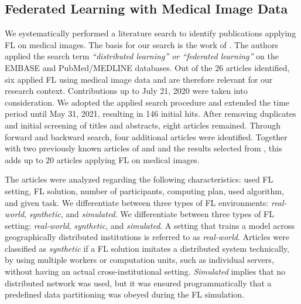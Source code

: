 \subsection{Federated Learning with Medical Image Data}
\label{subsec:LitRev}

We systematically performed a literature search to identify publications applying FL on medical images. The basis for our search is the work of \cite{Kirienko2021DistributedAI}. The authors applied the search term \textit{``distributed learning'' or ``federated learning''} on the EMBASE and PubMed/MEDLINE databases. Out of the 26 articles identified, six applied FL using medical image data and are therefore relevant for our research context. Contributions up to July 21, 2020 were taken into consideration. We adopted the applied search procedure and extended the time period until May 31, 2021, resulting in 146 initial hits. After removing duplicates and initial screening of titles and abstracts, eight articles remained. Through forward and backward search, four additional articles were identified. Together with two previously known articles of \cite{Wang2020AutomatedLearning} and \cite{Roth2020FederatedImplementation} and the results selected from \cite{Kirienko2021DistributedAI}, this adds up to 20 articles applying FL on medical images.

The articles were analyzed regarding the following characteristics: used FL setting, FL solution, number of participants, computing plan, used algorithm, and given task. We differentiate between three types of FL environments: \textit{real-world}, \textit{synthetic}, and \textit{simulated}.  We differentiate between three types of FL setting: \textit{real-world}, \textit{synthetic}, and \textit{simulated}.
A setting that trains a model across geographically distributed institutions is referred to as \textit{real-world}.
Articles were classified as \textit{synthetic} if a FL solution imitates a distributed system technically, by using multiple workers or computation units, such as individual servers, without having an actual cross-institutional setting. %
\textit{Simulated} implies that no distributed network was used, but it was ensured programmatically that a predefined data partitioning was obeyed during the FL simulation.

